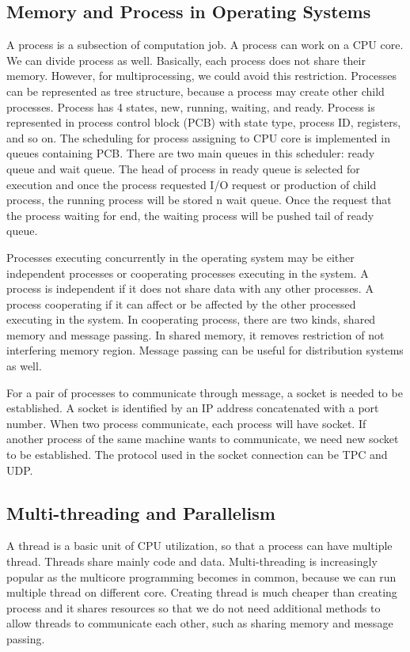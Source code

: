 \subsection{Memory and Process in Operating Systems}
\label{sec:os_mem_process}
A process is a subsection of computation job. A process can work on a CPU core. We can divide process as well.
Basically, each process does not share their memory. However, for multiprocessing, we could avoid this restriction.
Processes can be represented as tree structure, because a process may create other child processes.
Process has 4 states, new, running, waiting, and ready. 
Process is represented in process control block (PCB) with state type, process ID, registers, and so on.
The scheduling for process assigning to CPU core is implemented in queues containing PCB. There are two main queues in this scheduler: 
ready queue and wait queue. The head of process in ready queue is selected for execution and once the process requested I/O request or 
production of child process, the running process will be stored n wait queue. Once the request that the process waiting for end, 
the waiting process will be pushed tail of ready queue. 

Processes executing concurrently in the operating system may be either independent processes or cooperating processes executing in the system.
A process is independent if it does not share data with any other processes. A process cooperating if it can affect or be affected by the 
other processed executing in the system. In cooperating process, there are two kinds, shared memory and message passing. 
In shared memory, it removes restriction of not interfering memory region. Message passing can be useful for distribution systems as well.

For a pair of processes to communicate through message, a socket is needed to be established. 
A socket is identified by an IP address concatenated with a port number. When two process communicate, each process will have socket. 
If another process of the same machine wants to communicate, we need new socket to be established. The protocol used in the socket connection
can be TPC and UDP.

\subsection{Multi-threading and Parallelism}
\label{sec:os_thread}
A thread is a basic unit of CPU utilization, so that a process can have multiple thread. Threads share mainly code and data. 
Multi-threading is increasingly popular as the multicore programming becomes in common, because we can run multiple thread on different core.
Creating thread is much cheaper than creating process and it shares resources so that we do not need additional methods to allow threads to 
communicate each other, such as sharing memory and message passing.

